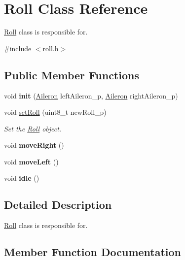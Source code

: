 \hypertarget{class_roll}{}\section{Roll Class Reference}
\label{class_roll}


\hyperlink{class_roll}{Roll} class is responsible for.  




{\ttfamily \#include $<$roll.\+h$>$}

\subsection*{Public Member Functions}
\begin{DoxyCompactItemize}
\item 
\mbox{\label{class_roll_a13f94b1901b6b29ec04ba48a510d2e2b}} 
void {\bfseries init} (\hyperlink{class_aileron}{Aileron} left\+Aileron\+\_\+p, \hyperlink{class_aileron}{Aileron} right\+Aileron\+\_\+p)
\item 
void \hyperlink{class_roll_ae01a67b5b8560af04fdd80ffb6344233}{set\+Roll} (uint8\+\_\+t new\+Roll\+\_\+p)
\begin{DoxyCompactList}\small\item\em Set the \hyperlink{class_roll}{Roll} object. \end{DoxyCompactList}\item 
\mbox{\label{class_roll_a4c536ea25a9b08f9e386aa85ff7336d7}} 
void {\bfseries move\+Right} ()
\item 
\mbox{\label{class_roll_a5939194b4f2fa52cb80549701247828f}} 
void {\bfseries move\+Left} ()
\item 
\mbox{\label{class_roll_aa8cd3b9e3f0eea82fad80203e4db73e2}} 
void {\bfseries idle} ()
\end{DoxyCompactItemize}


\subsection{Detailed Description}
\hyperlink{class_roll}{Roll} class is responsible for. 

\subsection{Member Function Documentation}
\mbox{\label{class_roll_ae01a67b5b8560af04fdd80ffb6344233}} 
